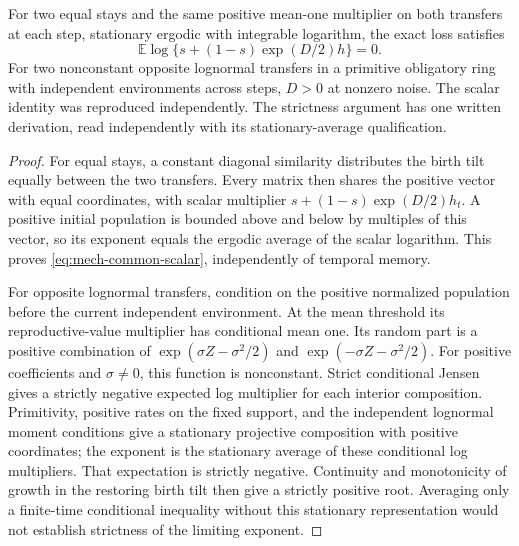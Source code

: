 \begin{lemma}\label{lem:mech-common-exact}
For two equal stays and the same positive mean-one multiplier on both transfers at each step, stationary ergodic with integrable logarithm, the exact loss satisfies
\begin{equation}\label{eq:mech-common-scalar}
 \mathbb E\log\{s+(1-s)\exp(D/2)h\}=0.
\end{equation}
For two nonconstant opposite lognormal transfers in a primitive obligatory ring with independent environments across steps, \(D>0\) at nonzero noise. The scalar identity was reproduced independently. The strictness argument has one written derivation, read independently with its stationary-average qualification.
\end{lemma}
\begin{proof}
For equal stays, a constant diagonal similarity distributes the birth tilt equally between the two transfers. Every matrix then shares the positive vector with equal coordinates, with scalar multiplier \(s+(1-s)\exp(D/2)h_t\). A positive initial population is bounded above and below by multiples of this vector, so its exponent equals the ergodic average of the scalar logarithm. This proves \eqref{eq:mech-common-scalar}, independently of temporal memory.

For opposite lognormal transfers, condition on the positive normalized population before the current independent environment. At the mean threshold its reproductive-value multiplier has conditional mean one. Its random part is a positive combination of \(\exp(\sigma Z-\sigma^2/2)\) and \(\exp(-\sigma Z-\sigma^2/2)\). For positive coefficients and \(\sigma\ne0\), this function is nonconstant. Strict conditional Jensen gives a strictly negative expected log multiplier for each interior composition. Primitivity, positive rates on the fixed support, and the independent lognormal moment conditions give a stationary projective composition with positive coordinates; the exponent is the stationary average of these conditional log multipliers. That expectation is strictly negative. Continuity and monotonicity of growth in the restoring birth tilt then give a strictly positive root. Averaging only a finite-time conditional inequality without this stationary representation would not establish strictness of the limiting exponent.
\end{proof}

